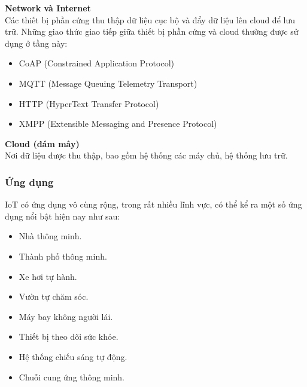 \documentclass[a4paper,12pt,oneside]{article}
\begin{document}
\noindent \textbf{Network và Internet}\\
\noindent Các thiết bị phần cứng thu thập dữ liệu cục bộ và đẩy dữ liệu lên cloud để lưu trữ. Những giao thức giao tiếp giữa thiết bị phần cứng và cloud thường được sử dụng ở tầng này:
\begin{itemize}
	\item CoAP (Constrained Application Protocol)
	\item MQTT (Message Queuing Telemetry Transport)
	\item HTTP (HyperText Transfer Protocol)
	\item XMPP (Extensible Messaging and Presence Protocol)
\end{itemize}

\noindent \textbf{Cloud (đám mây)}\\
\noindent Nơi dữ liệu được thu thập, bao gồm hệ thống các máy chủ, hệ thống lưu trữ.

\subsubsection{Ứng dụng}

\noindent IoT có ứng dụng vô cùng rộng, trong rất nhiều lĩnh vực, có thể kể ra một số ứng dụng nổi bật hiện nay như sau:
\begin{itemize}
\item Nhà thông minh.
\item Thành phố thông minh.
\item Xe hơi tự hành.
\item Vườn tự chăm sóc.
\item Máy bay không người lái.
\item Thiết bị theo dõi sức khỏe.
\item Hệ thống chiếu sáng tự động.
\item Chuỗi cung ứng thông minh.
\end{itemize}
\end{document}
